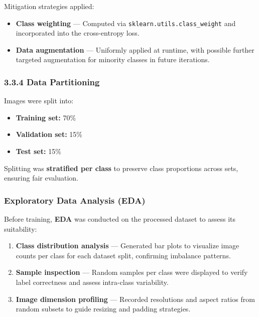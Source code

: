 \documentclass[
  12pt,
  oneside]{article}
\providecommand{\tightlist}{%
  \setlength{\itemsep}{0pt}\setlength{\parskip}{0pt}}
\begin{document}
Mitigation strategies applied:

\begin{itemize}
\tightlist
\item
  \textbf{Class weighting} --- Computed via
  \texttt{sklearn.utils.class\_weight} and incorporated into the
  cross-entropy loss.
\item
  \textbf{Data augmentation} --- Uniformly applied at runtime, with
  possible further targeted augmentation for minority classes in future
  iterations.
\end{itemize}

\subsubsection{3.3.4 Data Partitioning}\label{data-partitioning}

Images were split into:

\begin{itemize}
\tightlist
\item
  \textbf{Training set:} 70\%
\item
  \textbf{Validation set:} 15\%
\item
  \textbf{Test set:} 15\%
\end{itemize}

Splitting was \textbf{stratified per class} to preserve class
proportions across sets, ensuring fair evaluation.

\subsubsection{Exploratory Data Analysis
(EDA)}\label{exploratory-data-analysis-eda}

Before training, \textbf{EDA} was conducted on the processed dataset to
assess its suitability:

\begin{enumerate}
\def\labelenumi{\arabic{enumi}.}
\tightlist
\item
  \textbf{Class distribution analysis} --- Generated bar plots to
  visualize image counts per class for each dataset split, confirming
  imbalance patterns.
\item
  \textbf{Sample inspection} --- Random samples per class were displayed
  to verify label correctness and assess intra-class variability.
\item
  \textbf{Image dimension profiling} --- Recorded resolutions and aspect
  ratios from random subsets to guide resizing and padding strategies.
\end{enumerate}
\end{document}
